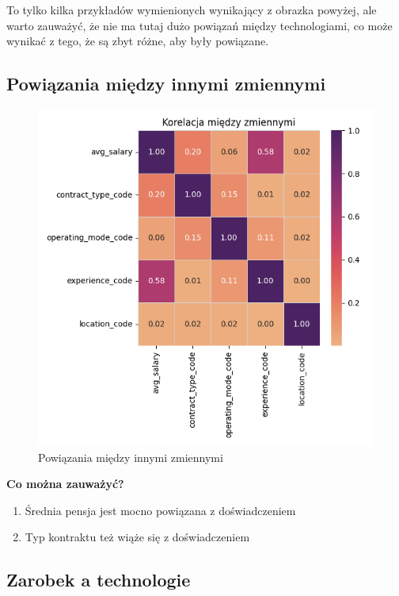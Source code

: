 \documentclass[a4paper]{article}
\begin{document}
\quad To tylko kilka przykładów wymienionych wynikający z obrazka powyżej, ale warto zauważyć, że nie ma tutaj dużo
powiązań między technologiami, co może wynikać z tego, że są zbyt różne, aby były powiązane.


\subsection{Powiązania między innymi zmiennymi}

\begin{figure}[H]
    \centering
    \includegraphics[width=\textwidth]{../analysis/plots/korelacje/korelacja_między_zmiennymi.png}
    \caption{Powiązania między innymi zmiennymi}
\end{figure}

\quad \textbf{Co można zauważyć?}

\begin{enumerate}
    \item Średnia pensja jest mocno powiązana z doświadczeniem
    \item Typ kontraktu też wiąże się z doświadczeniem
\end{enumerate}


\subsection{Zarobek a technologie}
\end{document}
